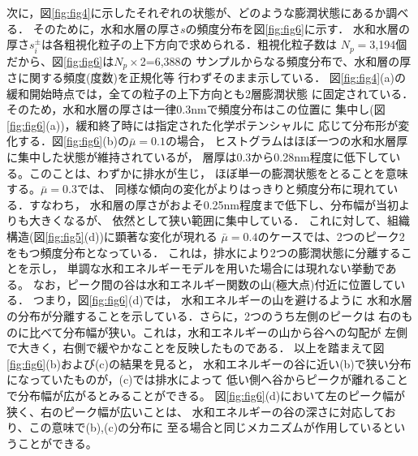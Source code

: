 次に，図\ref{fig:fig4}に示したそれぞれの状態が、どのような膨潤状態にあるか調べる．
そのために，水和水層の厚さ$s$の頻度分布を図\ref{fig:fig6}に示す．
水和水層の厚さ$s_i^\pm$は各粗視化粒子の上下方向で求められる．粗視化粒子数は
$N_p=$3,194個だから、図\ref{fig:fig6}は$N_p\times$2=6,388の
サンプルからなる頻度分布で、水和層の厚さに関する頻度(度数)を正規化等
行わずそのまま示している．
図\ref{fig:fig4}(a)の緩和開始時点では，全ての粒子の上下方向とも2層膨潤状態
に固定されている．そのため，水和水層の厚さは一律0.3nmで頻度分布はこの位置に
集中し(図\ref{fig:fig6}(a))，緩和終了時には指定された化学ポテンシャルに
応じて分布形が変化する．図\ref{fig:fig6}(b)の$\bar{\mu}=0.1$の場合，
ヒストグラムはほぼ一つの水和水層厚に集中した状態が維持されているが，
層厚は0.3から0.28nm程度に低下している。このことは、わずかに排水が生じ，
ほぼ単一の膨潤状態をとることを意味する。$\bar{\mu}=0.3$では、
同様な傾向の変化がよりはっきりと頻度分布に現れている．すなわち，
水和層の厚さがおよそ0.25nm程度まで低下し、分布幅が当初よりも大きくなるが、
依然として狭い範囲に集中している．
これに対して、組織構造(図\ref{fig:fig5}(d))に顕著な変化が現れる
$\bar{\mu}=0.4$のケースでは、2つのピーク2をもつ頻度分布となっている．
これは，排水により2つの膨潤状態に分離することを示し，
単調な水和エネルギーモデルを用いた場合には現れない挙動である。
なお，ピーク間の谷は水和エネルギー関数の山(極大点)付近に位置している．
つまり，図\ref{fig:fig6}(d)では， 水和エネルギーの山を避けるように
水和水層の分布が分離することを示している．さらに，2つのうち左側のピークは
右のものに比べて分布幅が狭い。これは，水和エネルギーの山から谷への勾配が
左側で大きく，右側で緩やかなことを反映したものである．
以上を踏まえて図\ref{fig:fig6}(b)および(c)の結果を見ると，
水和エネルギーの谷に近い(b)で狭い分布になっていたものが，(c)では排水によって
低い側へ谷からピークが離れることで分布幅が広がるとみることができる。
図\ref{fig:fig6}(d)において左のピーク幅が狭く、右のピーク幅が広いことは、
水和エネルギーの谷の深さに対応しており、この意味で(b),(c)の分布に
至る場合と同じメカニズムが作用しているということができる。

